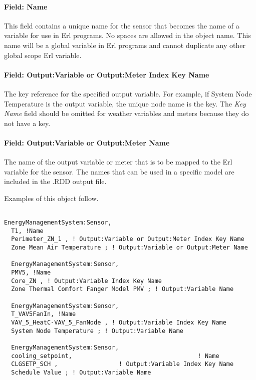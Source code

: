 \paragraph{Field: Name}\label{field-name-014}

This field contains a unique name for the sensor that becomes the name of a variable for use in Erl programs. No spaces are allowed in the object name. This name will be a global variable in Erl programs and cannot duplicate any other global scope Erl variable.

\paragraph{Field: Output:Variable or Output:Meter Index Key Name}\label{field-outputvariable-or-outputmeter-index-key-name}

The key reference for the specified output variable. For example, if System Node Temperature is the output variable, the unique node name is the key. The \emph{Key Name} field should be omitted for weather variables and meters because they do not have a key.

\paragraph{Field: Output:Variable or Output:Meter Name}\label{field-outputvariable-or-outputmeter-name}

The name of the output variable or meter that is to be mapped to the Erl variable for the sensor. The names that can be used in a specific model are included in the .RDD output file.

Examples of this object follow.

\begin{lstlisting}

EnergyManagementSystem:Sensor,
  T1, !Name
  Perimeter_ZN_1 , ! Output:Variable or Output:Meter Index Key Name
  Zone Mean Air Temperature ; ! Output:Variable or Output:Meter Name

  EnergyManagementSystem:Sensor,
  PMV5, !Name
  Core_ZN , ! Output:Variable Index Key Name
  Zone Thermal Comfort Fanger Model PMV ; ! Output:Variable Name

  EnergyManagementSystem:Sensor,
  T_VAV5FanIn, !Name
  VAV_5_HeatC-VAV_5_FanNode , ! Output:Variable Index Key Name
  System Node Temperature ; ! Output:Variable Name

  EnergyManagementSystem:Sensor,
  cooling_setpoint,                                   ! Name
  CLGSETP_SCH ,                 ! Output:Variable Index Key Name
  Schedule Value ; ! Output:Variable Name
\end{lstlisting}

